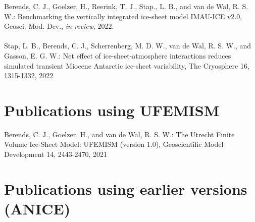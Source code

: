 \documentclass{article}
\begin{document}
Berends, C. J., Goelzer, H., Reerink, T. J., Stap., L. B., and van de Wal, R. S. W.: Benchmarking the vertically integrated ice-sheet model IMAU-ICE v2.0, Geosci. Mod. Dev., \textit{in review}, 2022.\\
\\
Stap, L. B., Berends, C. J., Scherrenberg, M. D. W., van de Wal, R. S. W., and Gasson, E. G. W.: Net effect of ice-sheet-atmosphere interactions reduces simulated transient Miocene Antarctic ice-sheet variability, The Cryosphere 16, 1315-1332, 2022

\section{Publications using UFEMISM}

Berends, C. J., Goelzer, H., and van de Wal, R. S. W.: The Utrecht Finite Volume Ice-Sheet Model: UFEMISM (version 1.0), Geoscientific Model Development 14, 2443-2470, 2021

\section{Publications using earlier versions (ANICE)}
\end{document}

